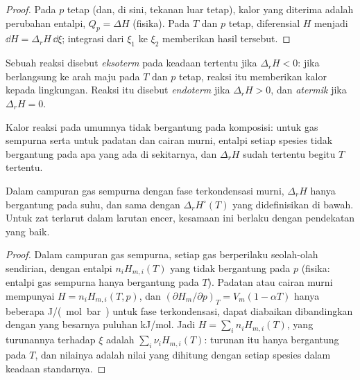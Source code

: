 \begin{proof}
Pada $p$ tetap (dan, di sini, tekanan luar tetap), kalor yang diterima
adalah perubahan entalpi, $Q_p = \Delta H$ (fisika). Pada $T$ dan $p$
tetap, diferensial $H$ menjadi $\dd H = \Delta_r H\,\dd\xi$; integrasi
dari $\xi_1$ ke $\xi_2$ memberikan hasil tersebut.
\end{proof}

\begin{definition}\label{def:b2:reaction-enthalpy:exothermic}
Sebuah reaksi disebut \emph{eksoterm} pada keadaan
tertentu jika $\Delta_r H < 0$: jika berlangsung ke arah maju pada $T$ dan
$p$ tetap, reaksi itu memberikan kalor kepada lingkungan. Reaksi itu
disebut \emph{endoterm} jika $\Delta_r H >
0$, dan
\emph{atermik} jika $\Delta_r H = 0$.
\end{definition}

Kalor reaksi pada umumnya tidak bergantung pada komposisi: untuk gas
sempurna serta untuk padatan dan cairan murni, entalpi setiap spesies
tidak bergantung pada apa yang ada di sekitarnya, dan $\Delta_r H$ sudah
tertentu begitu $T$ tertentu.

\begin{proposition}\label{prop:b2:reaction-enthalpy:ideal}
Dalam campuran gas sempurna dengan fase terkondensasi murni, $\Delta_r H$
hanya bergantung pada suhu, dan sama dengan 
$\Delta_r H^\circ(T)$ yang didefinisikan di bawah. Untuk zat terlarut
dalam larutan encer, kesamaan ini berlaku dengan pendekatan yang baik.
\end{proposition}

\begin{proof}
Dalam campuran gas sempurna, setiap gas berperilaku seolah-olah sendirian,
dengan entalpi $n_iH_{m,i}(T)$ yang tidak bergantung pada $p$ (fisika:
entalpi gas sempurna hanya bergantung pada $T$). Padatan atau cairan murni
mempunyai $H = n_iH_{m,i}(T,
p)$, dan $(\partial H_m/\partial p)_T = V_m(1 - \alpha T)$ hanya beberapa \unit{J/(mol.bar)} untuk fase
terkondensasi, dapat diabaikan dibandingkan dengan  yang
besarnya puluhan \unit{kJ/mol}. Jadi $H = \sum_in_iH_{m,i}(T)$, yang
turunannya terhadap $\xi$ adalah $\sum_i\nu_iH_{m,i}(T)$: turunan itu
hanya bergantung pada $T$, dan nilainya adalah nilai yang dihitung dengan
setiap spesies dalam keadaan standarnya.
\end{proof}

